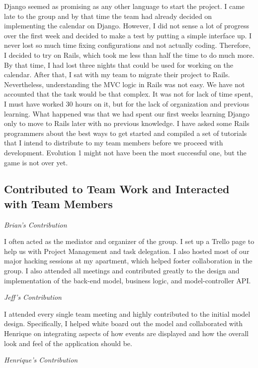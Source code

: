 \documentclass[11pt]{article}
\begin{document}
Django seemed as promising as any other language to start the project. I came late to the group and by that time the team had already decided on implementing the calendar on Django. However, I did not sense a lot of progress over the first week and decided to make a test by putting a simple interface up. I never lost so much time fixing configurations and not actually coding. Therefore, I decided to try on Rails, which took me less than half the time to do much more. By that time, I had lost three nights that could be used for working on the calendar. After that, I sat with my team to migrate their project to Rails. Nevertheless, understanding the MVC logic in Rails was not easy. We have not accounted that the task would be that complex. It was not for lack of time spent, I must have worked 30 hours on it, but for the lack of organization and previous learning. What happened was that we had spent our first weeks learning Django only to move to Rails later with no previous knowledge. I have asked some Rails programmers about the best ways to get started and compiled a set of tutorials that I intend to distribute to my team members before we proceed with development. Evolution 1 might not have been the most successful one, but the game is not over yet.

\subsection{Contributed to Team Work and Interacted with Team Members}

\textit{Brian's Contribution}

I often acted as the mediator and organizer of the group. I set up a Trello page to help us with Project Management and task delegation. I also hosted most of our major hacking sessions at my apartment, which helped foster collaboration in the group. I also attended all meetings and contributed greatly to the design and implementation of the back-end model, business logic, and model-controller API. 

\textit{Jeff's Contribution}

I attended every single team meeting and highly contributed to the initial model design.  Specifically, I helped white board out the model and collaborated with Henrique on integrating aspects of how events are displayed and how the overall look and feel of the application should be.

\textit{Henrique's Contribution}
\end{document}
